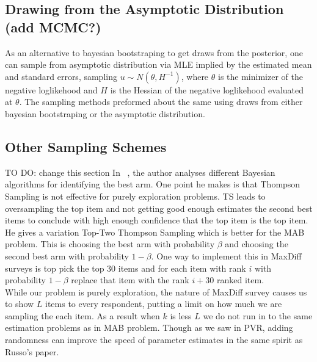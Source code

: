 \documentclass[nonblindrev]{informs3}
\begin{document}
\subsection{Drawing from the Asymptotic Distribution (add MCMC?)}
As an alternative to bayesian bootstraping to get draws from the posterior, one can sample from asymptotic distribution via MLE implied by the estimated mean and standard errors, sampling $u \sim N(\theta,H^{-1})$, where $\theta$ is the minimizer of the negative loglikehood and $H$ is the Hessian of the negative loglikehood evaluated at $\theta$. The sampling methods preformed about the same using draws from either bayesian bootstraping or the asymptotic distribution.

\subsection{Other Sampling Schemes}
TO DO: change this section
In ~\cite{russo2016simple}, the author analyses different Bayesian algorithms for identifying the best arm. One point he makes is that Thompson Sampling is not effective for purely exploration problems. TS leads to oversampling the top item and not getting good enough estimates the second best items to conclude with high enough confidence that the top item is the top item. He gives a variation Top-Two Thompson Sampling which is better for the MAB problem. This is choosing the best arm with probability $\beta$ and choosing the second best arm with probability $1-\beta$. One way to implement this in MaxDiff surveys is top pick the top 30 items and for each item with rank $i$ with probability $1-\beta$ replace that item with the rank $i+30$ ranked item.\\
While our problem is purely exploration, the nature of MaxDiff survey causes us to show $L$ items to every respondent, putting a limit on how much we are sampling the each item. As a result when $k$ is less $L$ we do not run in to the same estimation problems as in MAB problem. Though as we saw in PVR, adding randomness can improve the speed of parameter estimates in the same spirit as Russo's paper.\\
\end{document}
